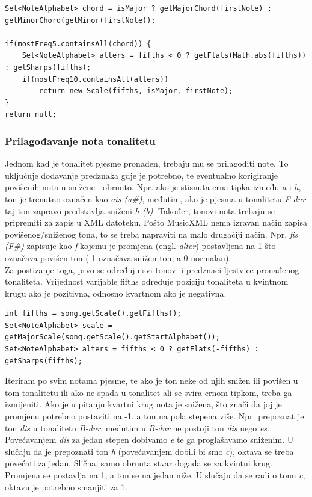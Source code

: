 \documentclass[times, utf8, zavrsni, numeric]{fer}
\begin{document}
\begin{lstlisting}
Set<NoteAlphabet> chord = isMajor ? getMajorChord(firstNote) : getMinorChord(getMinor(firstNote));
	
if(mostFreq5.containsAll(chord)) {
	Set<NoteAlphabet> alters = fifths < 0 ? getFlats(Math.abs(fifths)) : getSharps(fifths);
	if(mostFreq10.containsAll(alters))
		return new Scale(fifths, isMajor, firstNote);
}
return null;
\end{lstlisting}

\subsubsection{Prilagođavanje nota tonalitetu}
Jednom kad je tonalitet pjesme pronađen, trebaju mu se prilagoditi note. To uključuje dodavanje predznaka gdje je potrebno, te eventualno korigiranje povišenih nota u snižene i obrnuto. Npr. ako je stisnuta crna tipka između \textit{a} i \textit{h}, ton je trenutno označen kao \textit{ais (a\#)}, međutim, ako je pjesma u tonalitetu \textit{F-dur} taj ton zapravo predstavlja sniženi \textit{h (b)}. Također, tonovi nota trebaju se pripremiti za zapis u XML datoteku. Pošto MusicXML nema izravan način zapisa povišenog/sniženog tona, to se treba napraviti na malo drugačiji način. Npr. \textit{fis (F\#)} zapisuje kao \textit{f} kojemu je promjena (engl. \textit{alter}) postavljena na 1 što označava povišen ton (-1 označava snižen ton, a 0 normalan).\\

Za postizanje toga, prvo se određuju svi tonovi i predznaci ljestvice pronađenog tonaliteta. Vrijednost varijable fifths određuje poziciju tonaliteta u kvintnom krugu ako je pozitivna, odnosno kvartnom ako je negativna.

\begin{lstlisting}
int fifths = song.getScale().getFifths();
Set<NoteAlphabet> scale = getMajorScale(song.getScale().getStartAlphabet());
Set<NoteAlphabet> alters = fifths < 0 ? getFlats(-fifths) : getSharps(fifths);
\end{lstlisting}

Iteriram po svim notama pjesme, te ako je ton neke od njih snižen ili povišen u tom tonalitetu ili ako ne spada u tonalitet ali se svira crnom tipkom, treba ga izmijeniti. Ako je u pitanju kvartni krug nota je snižena, što znači da joj je promjenu potrebno postaviti na -1, a ton na pola stepena više. Npr. prepoznat je ton \textit{dis} u tonalitetu \textit{B-dur}, međutim u \textit{B-dur} ne postoji ton \textit{dis} nego \textit{es}. Povećavanjem \textit{dis} za jedan stepen dobivamo \textit{e} te ga proglašavamo sniženim. U slučaju da je prepoznati ton \textit{h} (povećavanjem dobili bi smo \textit{c}), oktava se treba povećati za jedan. Slična, samo obrnuta stvar događa se za kvintni krug. Promjena se postavlja na 1, a ton se na jedan niže. U slučaju da se radi o tonu \textit{c}, oktavu je potrebno smanjiti za 1.
\end{document}
